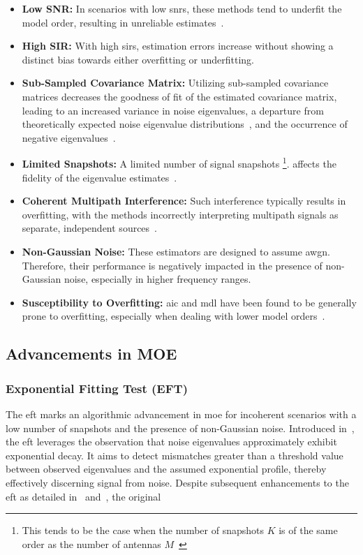 \begin{itemize}
    \item \textbf{Low SNR:} In scenarios with low \glspl{snr}, these methods tend to underfit the model
    order, resulting in unreliable estimates~\cite{eft, yu22RCNN}.
    \item \textbf{High SIR:} With high \glspl{sir}, estimation errors increase without showing a distinct bias
    towards either overfitting or underfitting.
    \item \textbf{Sub-Sampled Covariance Matrix:} Utilizing sub-sampled covariance matrices decreases the goodness of fit
    of the estimated covariance matrix, leading to an increased variance in noise eigenvalues, a departure from theoretically
    expected noise eigenvalue distributions~\cite{meyer}, and the occurrence of negative eigenvalues~\cite{barthelme21sub, meyer}.
    \item \textbf{Limited Snapshots:} A limited number of signal snapshots%
\footnote{This tends to be the case when the number of snapshots \( K \) is of the same order as the number of antennas \( M \)~\cite{eft}}.
    affects the fidelity of the eigenvalue estimates~\cite{eft, barthelme2020, barthelme21sub}.
    \item \textbf{Coherent Multipath Interference:} Such interference typically results in overfitting, with the methods
    incorrectly interpreting multipath signals as separate, independent sources~\cite{yu22RCNN}.
    \item \textbf{Non-Gaussian Noise:} These estimators are designed to assume \gls{awgn}. Therefore, their performance
    is negatively impacted in the presence of non-Gaussian noise, especially in higher frequency ranges.
    \item \textbf{Susceptibility to Overfitting:} \gls{aic} and \gls{mdl} have been found to be generally prone to
    overfitting, especially when dealing with lower model orders~\cite{barthelme2020, eft}.
\end{itemize}

\subsection{Advancements in MOE}

\subsubsection*{Exponential Fitting Test (EFT)}
The \gls{eft} marks an algorithmic advancement in \gls{moe} for incoherent scenarios with a low number of snapshots and
the presence of non-Gaussian noise.
Introduced in~\cite{eft}, the \gls{eft} leverages the observation that noise eigenvalues approximately exhibit exponential
decay. It aims to detect mismatches greater than a threshold value between observed eigenvalues and the assumed exponential
profile, thereby effectively discerning signal from noise.
Despite subsequent enhancements to the \gls{eft} as detailed in~\cite{costa2007} and~\cite{costa2009}, the original

